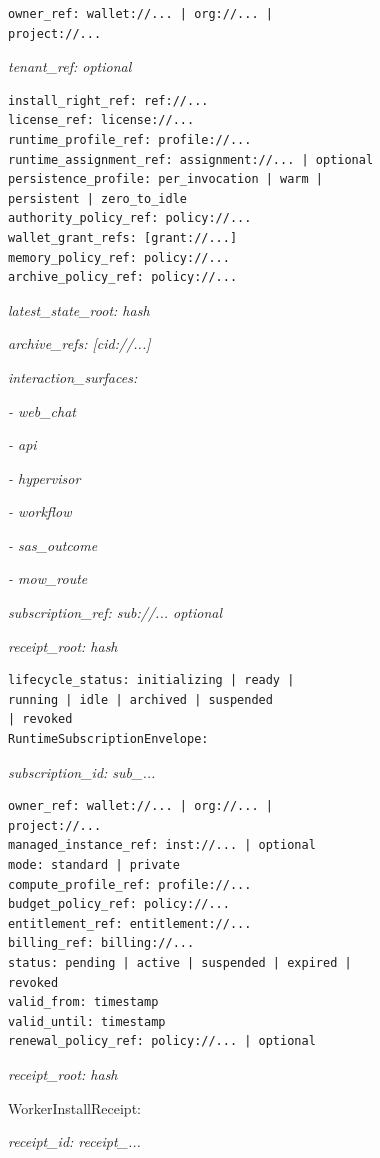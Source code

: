 \documentclass[
  11pt,
]{article}
\begin{document}
\begin{lstlisting}[language=rustioi]
owner_ref: wallet://... | org://... |
project://...
\end{lstlisting}
\emph{tenant\_ref: optional}

\begin{lstlisting}[language={},basicstyle=\ttfamily\scriptsize]
install_right_ref: ref://...
license_ref: license://...
runtime_profile_ref: profile://...
runtime_assignment_ref: assignment://... | optional
persistence_profile: per_invocation | warm |
persistent | zero_to_idle
authority_policy_ref: policy://...
wallet_grant_refs: [grant://...]
memory_policy_ref: policy://...
archive_policy_ref: policy://...
\end{lstlisting}
\emph{latest\_state\_root: hash}

\emph{archive\_refs: {[}cid://...{]}}

\emph{interaction\_surfaces:}

\emph{- web\_chat}

\emph{- api}

\emph{- hypervisor}

\emph{- workflow}

\emph{- sas\_outcome}

\emph{- mow\_route}

\emph{subscription\_ref: sub://... \textbar{} optional}

\emph{receipt\_root: hash}

\begin{lstlisting}[language={},basicstyle=\ttfamily\scriptsize]
lifecycle_status: initializing | ready |
running | idle | archived | suspended
| revoked
RuntimeSubscriptionEnvelope:
\end{lstlisting}
\emph{subscription\_id: sub\_...}

\begin{lstlisting}[language={},basicstyle=\ttfamily\scriptsize]
owner_ref: wallet://... | org://... |
project://...
managed_instance_ref: inst://... | optional
mode: standard | private
compute_profile_ref: profile://...
budget_policy_ref: policy://...
entitlement_ref: entitlement://...
billing_ref: billing://...
status: pending | active | suspended | expired |
revoked
valid_from: timestamp
valid_until: timestamp
renewal_policy_ref: policy://... | optional
\end{lstlisting}
\emph{receipt\_root: hash}

WorkerInstallReceipt:

\emph{receipt\_id: receipt\_...}
\end{document}

